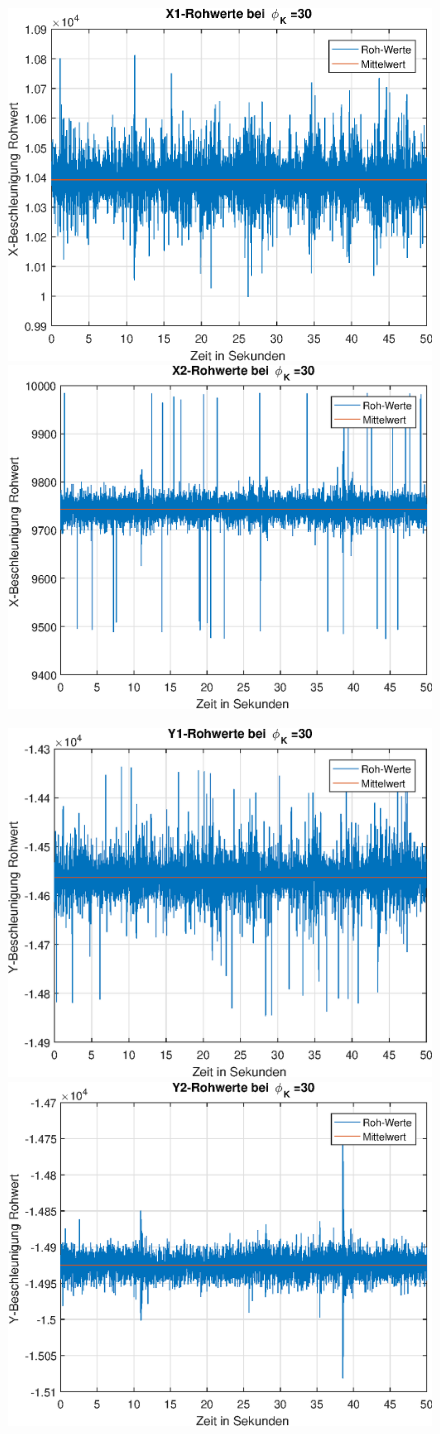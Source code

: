 \documentclass{article}
\begin{document}
\newpage
\begin{figure}[h]
	\includegraphics[width=0.5\linewidth]{img/phiK30_x1_raw.eps}
	\includegraphics[width=0.5\linewidth]{img/phiK30_x2_raw.eps}
\end{figure}
\begin{figure}[h]
	\includegraphics[width=0.5\linewidth]{img/phiK30_y1_raw.eps}
	\includegraphics[width=0.5\linewidth]{img/phiK30_y2_raw.eps}
\end{figure}
\end{document}
